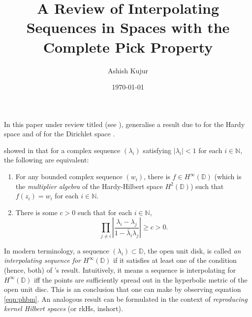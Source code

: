 \documentclass[12pt]{amsart}
\title{A Review of Interpolating Sequences in Spaces with the Complete Pick Property}
\author{Ashish Kujur}
\date{\today}
\theoremstyle{definition}
\numberwithin{equation}{section}
\theoremstyle{remark}
\theoremstyle{plain}
\newcommand{\N}{\mathbb N}
\newcommand{\C}{\mathbb C}
\newcommand{\D}{\mathbb D}
\newcommand{\calH}{{\mathcal H}}
\newcommand{\calM}{{\mathcal M}}
\newcommand{\abs}[1]{\left\lvert #1 \right\rvert}
\begin{document}
\maketitle
In this paper under review titled  (see \cite{zbMATH07130838}), \citeauthor{zbMATH07130838} generalise a result due to \citeauthor{MR0117349} for the Hardy space \cite{MR0117349} and of \citeauthor{Marshall1994InterpolatingSF} for the Dirichlet space \cite{Marshall1994InterpolatingSF}. 


\citeauthor{MR0117349} showed in \cite{MR0117349} that for a complex sequence $\left( \lambda_{i} \right)$ satisfying $\abs{\lambda_{i}} < 1$ for each $i \in \N$, the following are equivalent:
\begin{enumerate}
\item For any bounded complex sequence $\left( w_{i} \right)$, there is $f\in H^{\infty} \left( \D \right)$ (which is the \textit{multiplier algebra} of the Hardy-Hilbert space $H^{2} \left( \D \right)$) such that $f\left( z_{i} \right)=w_{i}$ for each $i\in \N$.
\item There is some $c>0$ such that for each $i \in \N$, 
\begin{equation}
\prod_{j\ne i} \abs{\frac{\lambda_{i}-\lambda_{j}}{1-\bar \lambda_{i} \lambda_{j}}} \ge c > 0.
\label{eqn:phbm}
\end{equation}
\end{enumerate}
In modern terminology, a sequence $\left( \lambda_{i} \right) \subset \D$, the open unit disk, is called \textit{an interpolating sequence for $H^{\infty} \left( \D \right)$} if it satisfies at least one of the condition (hence, both) of \citeauthor{MR0117349}'s result. Intuitively, it means a sequence is interpolating for $H^{\infty} \left( \D \right)$ iff the points are sufficiently spread out in the hyperbolic metric of the open unit disc. This is an conclusion that one can make by observing equation \ref{eqn:phbm}. An analogous result can be formulated in the context of \textit{reproducing kernel Hilbert spaces} (or rkHs, inshort).
\end{document}
